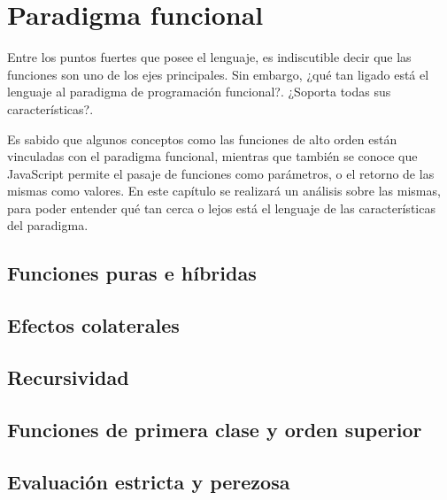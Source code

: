 \chapter{Paradigma funcional}

\label{Chapter3}


Entre los puntos fuertes que posee el lenguaje, es indiscutible decir que las funciones son uno de los ejes principales. Sin embargo, ¿qué tan ligado está el lenguaje al paradigma de programación funcional?. ¿Soporta todas sus características?.

Es sabido que algunos conceptos como las funciones de alto orden están vinculadas con el paradigma funcional, mientras que también se conoce que JavaScript permite el pasaje de funciones como parámetros, o el retorno de las mismas como valores. En este capítulo se realizará un análisis sobre las mismas, para poder entender qué tan cerca o lejos está el lenguaje de las características del paradigma.


\section{Funciones puras e híbridas}

\section{Efectos colaterales}

\section{Recursividad}

\section{Funciones de primera clase y orden superior}

\section{Evaluación estricta y perezosa}
